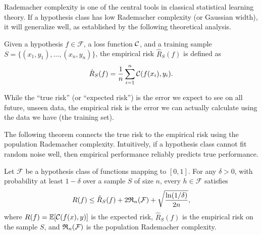 \medskip
Rademacher complexity is one of the central tools 
in classical statistical learning theory.
 If a hypothesis class has low Rademacher complexity (or Gaussian width), it will generalize well, as established by the following theoretical analysis. 

\begin{definition}\label{de:risk}
Given a hypothesis $f \in \mathcal{F}$, a loss function ${\mathcal C}$, and a training sample $S = \{(x_1, y_1), \dots, (x_n, y_n)\}$, the empirical risk $\hat{R}_S(f)$ is defined as 
$$\hat{R}_S(f) = \frac{1}{n} \sum_{i=1}^n {\mathcal C}(f(x_i), y_i).$$
\end{definition}

While the ``true risk'' (or ``expected risk'') is the error we expect to see on all future, unseen data, the empirical risk is the error we can actually calculate using the data we have (the training set).

The following theorem connects the true risk to the empirical risk  using the population Rademacher complexity.
Intuitively, if a hypothesis class cannot fit random noise well, then empirical performance reliably predicts true performance.

\begin{theorem}\label{th:rademachergeneralization}
Let $\mathcal{F}$ be a hypothesis class of functions mapping to $[0, 1]$. For any $\delta > 0$, with probability at least $1 - \delta$ over a sample $S$ of size $n$, every $h \in \mathcal{F}$ satisfies
\begin{equation}\label{eq:radebound}
R(f) \leq \hat{R}_S(f) + 2\mathfrak{R}_n(\mathcal{F}) + \sqrt{\frac{\ln(1/\delta)}{2n}},
\end{equation}
where $R(f) = \mathbb{E}[{\mathcal C}(f(x), y)]$ is the expected risk, $\hat{R}_S(f)$ is the empirical risk on the sample $S$, and  $\mathfrak{R}_n(\mathcal{F})$ is the population Rademacher complexity.
\end{theorem}

